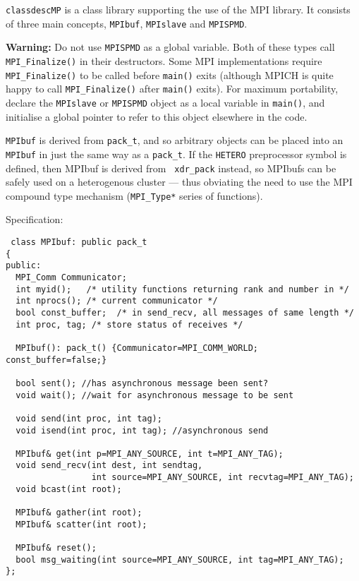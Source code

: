 
{\tt classdescMP} is a class library supporting the use of the MPI
library. It consists of three main concepts, {\tt MPIbuf},
{\tt MPIslave} and {\tt MPISPMD}.

{\bf Warning:} Do not use {\tt MPISPMD} as a global
variable. Both of these types call \verb+MPI_Finalize()+ in their
destructors. Some MPI implementations require \verb+MPI_Finalize()+ to
be called before \verb+main()+ exits (although MPICH is quite happy to
call \verb+MPI_Finalize()+ after \verb+main()+ exits). For maximum
portability, declare the {\tt MPIslave} or {\tt MPISPMD} object as a
local variable in \verb+main()+, and initialise a global pointer to
refer to this object elsewhere in the code.


{\tt MPIbuf} is derived from {\tt pack\_t}, and so
arbitrary objects can be placed into an {\tt MPIbuf} in just the same
way as a {\tt pack\_t}. If the \verb+HETERO+
preprocessor symbol is defined, then MPIbuf is derived from {\tt
xdr\_pack} instead, so MPIbufs can be safely used on
a heterogenous cluster --- thus obviating the need to use the MPI
compound type mechanism ({\tt MPI\_Type*} series of functions).

Specification:
\begin{verbatim}
 class MPIbuf: public pack_t
{
public:
  MPI_Comm Communicator;
  int myid();   /* utility functions returning rank and number in */
  int nprocs(); /* current communicator */
  bool const_buffer;  /* in send_recv, all messages of same length */
  int proc, tag; /* store status of receives */

  MPIbuf(): pack_t() {Communicator=MPI_COMM_WORLD; const_buffer=false;}

  bool sent(); //has asynchronous message been sent?
  void wait(); //wait for asynchronous message to be sent

  void send(int proc, int tag);
  void isend(int proc, int tag); //asynchronous send

  MPIbuf& get(int p=MPI_ANY_SOURCE, int t=MPI_ANY_TAG);
  void send_recv(int dest, int sendtag, 
                 int source=MPI_ANY_SOURCE, int recvtag=MPI_ANY_TAG);
  void bcast(int root);

  MPIbuf& gather(int root);
  MPIbuf& scatter(int root); 

  MPIbuf& reset();
  bool msg_waiting(int source=MPI_ANY_SOURCE, int tag=MPI_ANY_TAG);
};
\end{verbatim}


